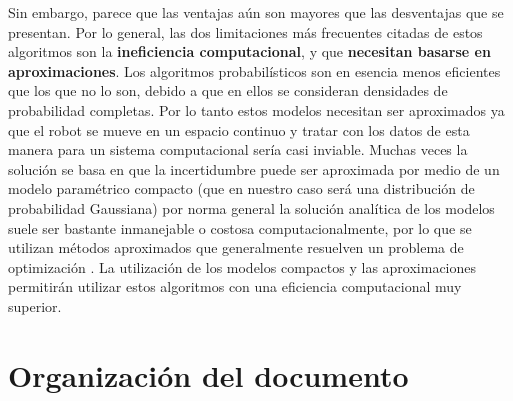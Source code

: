 Sin embargo, parece que las ventajas aún son mayores que las desventajas que se presentan. Por lo general, las dos limitaciones más frecuentes citadas de estos algoritmos son la \textbf{ineficiencia computacional}, y que \textbf{necesitan basarse en aproximaciones}. Los algoritmos probabilísticos son en esencia menos eficientes que los que no lo son, debido a que en ellos se consideran densidades de probabilidad completas. Por lo tanto estos modelos necesitan ser aproximados ya que el robot se mueve en un espacio continuo y tratar con los datos de esta manera para un sistema computacional sería casi inviable. Muchas veces la solución se basa en que la incertidumbre puede ser aproximada por medio de un modelo paramétrico compacto (que en nuestro caso será una distribución de probabilidad Gaussiana) por norma general la solución analítica de los modelos suele ser bastante inmanejable o costosa computacionalmente, por lo que se utilizan métodos aproximados que generalmente resuelven un problema de optimización . La utilización de los modelos compactos y las aproximaciones permitirán utilizar estos algoritmos con una eficiencia computacional muy superior.
%
%
%

\section{Organización del documento}
%
%
%

